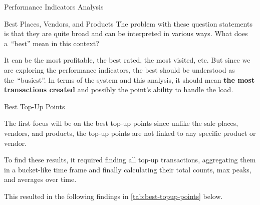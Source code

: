 \begin{section}{Performance Indicators Analysis}
\begin{subsection}{Best Places, Vendors, and Products}
		The problem with these question statements is that they are quite broad and can be interpreted in various ways.
		What does a~\enquote{best} mean in this context?

		It can be the most profitable, the best rated, the most visited, etc.
		But since we are exploring the performance indicators, the best should be understood as the~\enquote{busiest}.
		In terms of the system and this analysis, it should mean \textbf{the most transactions created} and possibly the point's ability to handle the load.

		\begin{subsubsection}{Best Top-Up Points}
			\label{subsubsec:analysis-best-top-up-points}

			The first focus will be on the best top-up points since unlike the sale places, vendors, and products, the top-up points are not linked to any specific product or vendor.


			To find these results, it required finding all top-up transactions, aggregating them in a bucket-like time frame and finally calculating their total counts, max peaks, and averages over time.

			This resulted in the following findings in \autoref{tab:best-topup-points} below.


\end{subsubsection}
\end{subsection}
\end{section}
